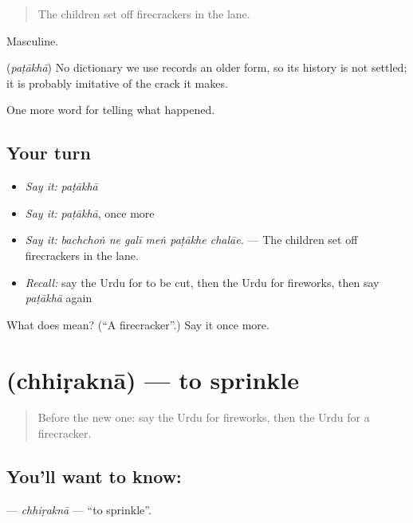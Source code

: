 \begin{quote}
The children set off firecrackers in the lane.
\end{quote}

Masculine.

\begin{cousinweb}
\textbf{} (\emph{paṭākhā}) No dictionary we use records an older form, so its history is not settled; it is probably imitative of the crack it makes.
\end{cousinweb}

\begin{grammarlens}[title={What you've built}]
One more word for telling what happened.
\end{grammarlens}

\subsection*{Your turn}
\begin{itemize}
\raggedright
  \item \emph{Say it:} \emph{paṭākhā}
  \item \emph{Say it:} \emph{paṭākhā}, once more
  \item \emph{Say it:} \emph{bachchoṅ ne galī meṅ paṭākhe chalāe.} — The children set off firecrackers in the lane.
  \item \emph{Recall:} say the Urdu for to be cut, then the Urdu for fireworks, then say \emph{paṭākhā} again
\end{itemize}

\begin{tcolorbox}[breakable,colback=teal!4,colframe=teal!35!black,title={Before you move on}]
What does  mean? (\textquotedblleft{}A firecracker\textquotedblright{}.) Say it once more.
\end{tcolorbox}
\section[\texorpdfstring{\ur{چھڑکنا} (chhiṛaknā)}{چھڑکنا (chhiṛaknā)}]{ (chhiṛaknā) — to sprinkle}

\label{lesson:UR-C320-chhirakna}



\begin{quote}
Before the new one: say the Urdu for fireworks, then the Urdu for a firecracker.
\end{quote}

\subsection*{You'll want to know: }
\textbf{} — \emph{chhiṛaknā} — \textquotedblleft{}to sprinkle\textquotedblright{}.

